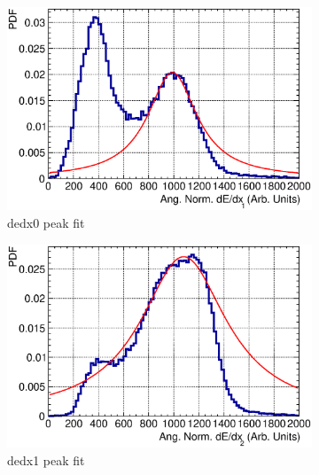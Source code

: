   \begin{figure}[t]
    \centering
    \begin{subfigure}{\dbfigwid\textwidth}
         \includegraphics[width=\textwidth]{figures/sel/fig54a.eps}
         \caption{dedx0 peak fit}
         \label{subfig:dedx0-peak}
    \end{subfigure}
    \begin{subfigure}{\dbfigwid\textwidth}
         \includegraphics[width=\textwidth]{figures/sel/fig54b.eps}
         \caption{dedx1 peak fit}
         \label{subfig:dedx1-peak}
    \end{subfigure}
    \\
    \begin{subfigure}{\dbfigwid\textwidth}

\end{subfigure}
\end{figure}
